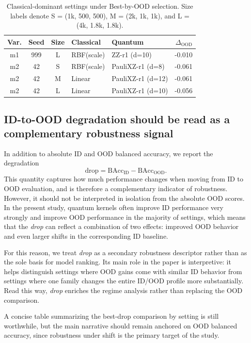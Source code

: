 \documentclass[pdflatex,sn-mathphys-num]{sn-jnl}%
\theoremstyle{thmstyleone}%
\theoremstyle{thmstyletwo}%
\theoremstyle{thmstylethree}%
\begin{document}
\begin{table}[t]
\centering
\caption{Classical-dominant settings under Best-by-OOD selection. Size labels denote S = (1k, 500, 500), M = (2k, 1k, 1k), and L = (4k, 1.8k, 1.8k).}
\label{tab:classical_dominant}
\small
\setlength{\tabcolsep}{4pt}
\begin{tabular}{@{}cccp{1.45cm}p{1.9cm}r@{}}
\toprule
Var. & Seed & Size & Classical & Quantum & $\Delta_{\mathrm{OOD}}$ \\
\midrule
m1 & 999 & L & RBF(scale) & ZZ-r1 (d=10)      & -0.010 \\
m2 & 42  & S & RBF(scale) & PauliXZ-r1 (d=8)  & -0.061 \\
m2 & 42  & M & Linear     & PauliXZ-r1 (d=12) & -0.061 \\
m2 & 42  & L & Linear     & PauliXZ-r1 (d=10) & -0.056 \\
\bottomrule
\end{tabular}
\end{table}

\subsection{ID-to-OOD degradation should be read as a complementary robustness signal}

In addition to absolute ID and OOD balanced accuracy, we report the degradation
\[
\mathrm{drop} = \mathrm{BAcc}_{\mathrm{ID}} - \mathrm{BAcc}_{\mathrm{OOD}}.
\]
This quantity captures how much performance changes when moving from ID to OOD evaluation, and is therefore a complementary indicator of robustness. However, it should not be interpreted in isolation from the absolute OOD scores. In the present study, quantum kernels often improve ID performance very strongly and improve OOD performance in the majority of settings, which means that the \emph{drop} can reflect a combination of two effects: improved OOD behavior and even larger shifts in the corresponding ID baseline.

For this reason, we treat \emph{drop} as a secondary robustness descriptor rather than as the sole basis for model ranking. Its main role in the paper is interpretive: it helps distinguish settings where OOD gains come with similar ID behavior from settings where one family changes the entire ID/OOD profile more substantially. Read this way, \emph{drop} enriches the regime analysis rather than replacing the OOD comparison.

A concise table summarizing the best-drop comparison by setting is still worthwhile, but the main narrative should remain anchored on OOD balanced accuracy, since robustness under shift is the primary target of the study.
\end{document}
